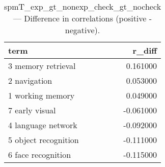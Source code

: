 \begin{table}
\caption{spmT_exp_gt_nonexp_check_gt_nocheck — Difference in correlations (positive - negative).}
\label{tab:spmT_exp_gt_nonexp_check_gt_nocheck_diff}
\begin{tabular}{lr}
\toprule
term & r\_diff \\
\midrule
3 memory retrieval & 0.161000 \\
2 navigation & 0.053000 \\
1 working memory & 0.049000 \\
7 early visual & -0.061000 \\
4 language network & -0.092000 \\
5 object recognition & -0.111000 \\
6 face recognition & -0.115000 \\
\bottomrule
\end{tabular}
\end{table}
